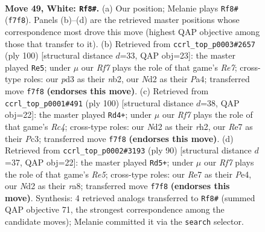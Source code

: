\documentclass[11pt]{article}
\begin{document}
\clearpage

\begin{figure}[p]\centering
\begin{subfigure}{0.46\textwidth}\centering
\resizebox{\linewidth}{!}{%
\newchessgame
\chessboard[
  setfen={6k1/4RR2/7B/8/1p4P1/pP1p4/P1PN3K/8 w - - 2 49},
  showmover=false,
  pgfstyle=straightmove, color=movearrow, markmove={f7-f8}
]}
\caption{}
\end{subfigure}\hfill
\begin{subfigure}{0.46\textwidth}\centering
\resizebox{\linewidth}{!}{%
\newchessgame
\chessboard[
  setfen={3r4/R3R2p/3k2p1/5p2/P2p1P2/6P1/1n6/6K1 w - - 0 51},
  showmover=false,
  pgfstyle=straightmove, color=movearrow, markmove={e7-e5}
]}
\caption{}
\end{subfigure}
\\[4pt]
\begin{subfigure}{0.46\textwidth}\centering
\resizebox{\linewidth}{!}{%
\newchessgame
\chessboard[
  setfen={8/8/p1p4p/P2k4/1PR5/2P1p1P1/7r/5K2 w - - 2 51},
  showmover=false,
  pgfstyle=straightmove, color=movearrow, markmove={c4-d4}
]}
\caption{}
\end{subfigure}\hfill
\begin{subfigure}{0.46\textwidth}\centering
\resizebox{\linewidth}{!}{%
\newchessgame
\chessboard[
  setfen={r7/5p2/3k2p1/4R2p/4P2P/5PP1/4K3/8 w - - 1 46},
  showmover=false,
  pgfstyle=straightmove, color=movearrow, markmove={e5-d5}
]}
\caption{}
\end{subfigure}
\caption{\textbf{Move 49, White: \texttt{Rf8\#}.} (a) Our position; Melanie plays \texttt{Rf8\#} (\texttt{f7f8}). Panels (b)--(d) are the retrieved master positions whose correspondence most drove this move (highest QAP objective among those that transfer to it). (b) Retrieved from \texttt{ccrl\_top\_p0003\#2657} (ply 100) [structural distance $d$=33, QAP obj=23]: the master played \texttt{Re5}; under $\mu$ our \emph{Rf7} plays the role of that game's \emph{Re7}; cross-type roles: our \emph{p}d3 as their \emph{n}b2, our \emph{N}d2 as their \emph{P}a4; transferred move \texttt{f7f8} \textbf{(endorses this move)}. (c) Retrieved from \texttt{ccrl\_top\_p0001\#491} (ply 100) [structural distance $d$=38, QAP obj=22]: the master played \texttt{Rd4+}; under $\mu$ our \emph{Rf7} plays the role of that game's \emph{Rc4}; cross-type roles: our \emph{N}d2 as their \emph{r}h2, our \emph{R}e7 as their \emph{P}c3; transferred move \texttt{f7f8} \textbf{(endorses this move)}. (d) Retrieved from \texttt{ccrl\_top\_p0002\#3193} (ply 90) [structural distance $d$=37, QAP obj=22]: the master played \texttt{Rd5+}; under $\mu$ our \emph{Rf7} plays the role of that game's \emph{Re5}; cross-type roles: our \emph{R}e7 as their \emph{P}e4, our \emph{N}d2 as their \emph{r}a8; transferred move \texttt{f7f8} \textbf{(endorses this move)}. Synthesis: 4 retrieved analogs transferred to \texttt{Rf8\#} (summed QAP objective 71, the strongest correspondence among the candidate moves); Melanie committed it via the \texttt{search} selector.}
\label{fig:thought-m96}
\end{figure}
\end{document}
